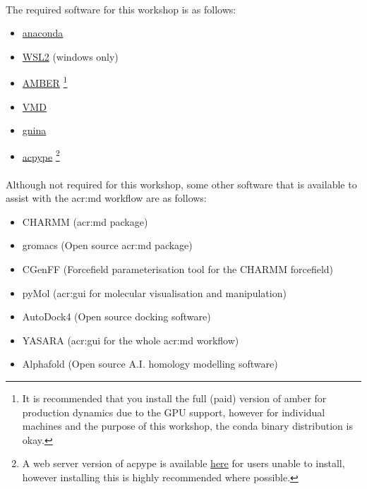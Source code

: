     \paragraph{}
    The required software for this workshop is as follows:
\begin{itemize}
    \item \href{https://www.anaconda.com/download/}{anaconda}
    \item \href{https://learn.microsoft.com/en-us/windows/wsl/install}{WSL2} (windows only)
    \item \href{https://ambermd.org/GetAmber.php}{AMBER} \footnote{It is recommended that you install the full (paid) version of amber for production dynamics due to the GPU support, however for individual machines and the purpose of this workshop, the conda binary distribution is okay.}
    \item \href{https://www.ks.uiuc.edu/Development/Download/download.cgi?PackageName=VMD}{VMD}
    \item \href{https://github.com/gnina/gnina}{gnina}
    \item \href{https://pypi.org/project/acpype/}{acpype} \footnote{A web server version of acpype is available \href{https://www.bio2byte.be/acpype/submit/}{here} for users unable to install, however installing this is highly recommended where possible.}
\end{itemize}

    \paragraph{}
    Although not required for this workshop, some other software that is available to assist with the \gls{acr:md} workflow are as follows:

\begin{itemize}
    \item CHARMM (\gls{acr:md} package)
    \item gromacs (Open source \gls{acr:md} package)
    \item CGenFF (Forcefield parameterisation tool for the CHARMM forcefield)
    \item pyMol (\gls{acr:gui} for molecular visualisation and manipulation)
    \item AutoDock4 (Open source docking software)
    \item YASARA (\gls{acr:gui} for the whole \gls{acr:md} workflow)
    \item Alphafold (Open source A.I. homology modelling software)
\end{itemize}


